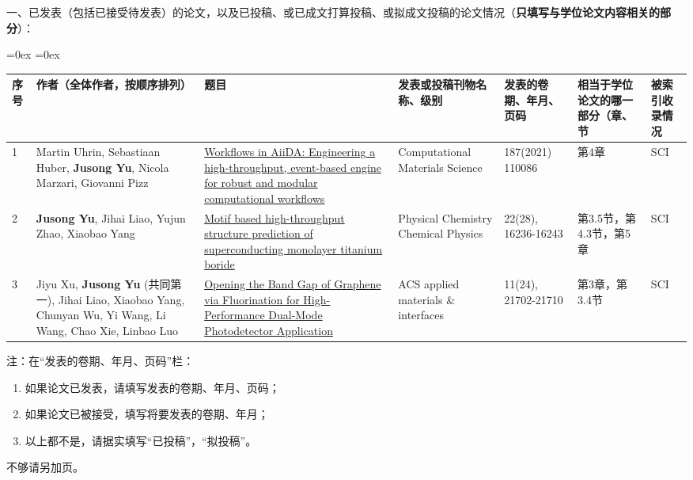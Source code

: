 \documentclass[phd,nobackinfo]{scutthesis}
\begin{document}
\begin{resume}
\noindent 一、已发表（包括已接受待发表）的论文，以及已投稿、或已成文打算投稿、或拟成文投稿的论文情况（{\textbf{只填写与学位论文内容相关的部分}}）：

\begin{adjustbox}{center}
  \aboverulesep=0ex
  \belowrulesep=0ex
  \renewcommand{\arraystretch}{1.1}
    \centering
    \begin{tabular}{|p{2mm}|p{28mm}|p{50mm}|p{24mm}|p{20mm}|p{16mm}|p{10mm}|}
      \toprule
      \textbf{序号} & \textbf{作者（全体作者，按顺序排列）} & \textbf{题目} & \textbf{发表或投稿刊物名称、级别} & \textbf{发表的卷期、年月、页码} & \textbf{相当于学位论文的哪一部分（章、节} & \textbf{被索引收录情况}\\
      \midrule
        1 & Martin Uhrin, Sebastiaan Huber, {\textbf{Jusong Yu}}, Nicola Marzari, Giovanni Pizz & \href{https://doi.org/10.1016/j.commatsci.2020.110086}{Workflows in AiiDA: Engineering a high-throughput, event-based engine for robust and modular computational workflows} & Computational Materials Science & 187(2021) 110086 & 第4章 & SCI \\
        \midrule
        2 & {\textbf{Jusong Yu}}, Jihai Liao, Yujun Zhao, Xiaobao Yang & \href{https://doi.org/10.1039/D0CP01540G}{Motif based high-throughput structure prediction of superconducting monolayer titanium boride} & Physical Chemistry Chemical Physics & 22(28), 16236-16243 & 第3.5节，第4.3节，第5章 & SCI \\
        \midrule
        3 & Jiyu Xu, {\textbf{Jusong Yu}} (共同第一), Jihai Liao, Xiaobao Yang, Chunyan Wu, Yi Wang, Li Wang, Chao Xie, Linbao Luo & \href{https://doi.org/10.1021/acsami.9b04389}{Opening the Band Gap of Graphene via Fluorination for High-Performance Dual-Mode Photodetector Application} & ACS applied materials \& interfaces & 11(24), 21702-21710 & 第3章，第3.4节 & SCI \\
      \bottomrule
    \end{tabular}
\end{adjustbox}

\noindent 注：在“发表的卷期、年月、页码”栏：
\begin{enumerate}
  \item 如果论文已发表，请填写发表的卷期、年月、页码；
  \item 如果论文已被接受，填写将要发表的卷期、年月；
  \item 以上都不是，请据实填写“已投稿”，“拟投稿”。
\end{enumerate}
不够请另加页。


\end{resume}
\end{document}

